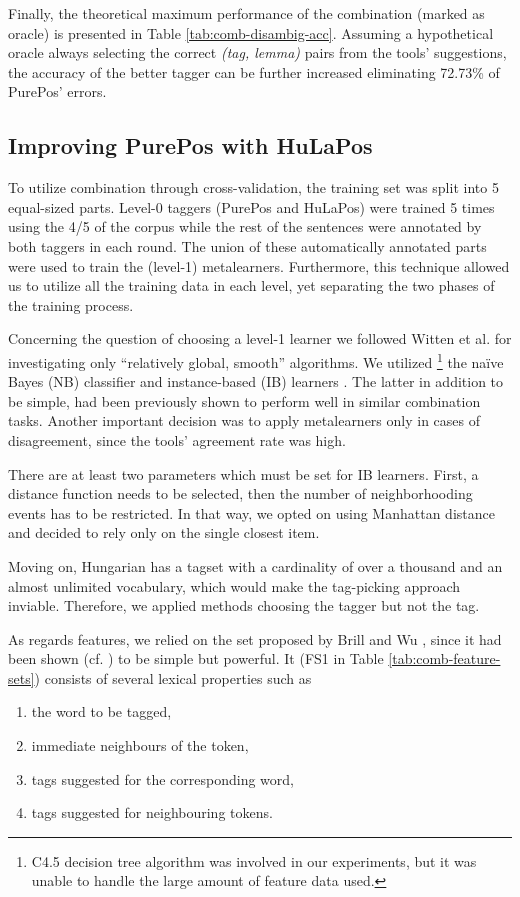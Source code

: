 Finally, the theoretical maximum performance of the combination (marked as oracle) is presented in Table \ref{tab:comb-disambig-acc}.
Assuming a hypothetical oracle always selecting the correct \emph{(tag, lemma)} pairs from the tools' suggestions, the accuracy of the better tagger can be further increased eliminating 72.73\% of PurePos' errors. 

\subsection{Improving PurePos with HuLaPos}

To utilize combination through cross-validation, the training set was split into 5 equal-sized parts.
Level-0 taggers (PurePos and HuLaPos) were trained 5 times using the 4/5 of the corpus while the rest of the sentences were annotated by both taggers in each round.
The union of these automatically annotated parts were used to train the (level-1) metalearners.
Furthermore, this technique allowed us to utilize all the training data in each level, yet separating the two phases of the training process. 

Concerning the question of choosing a level-1 learner we followed Witten et al. \cite{Witten2011} for investigating only ``relatively global, smooth'' algorithms.
We utilized \footnote{C4.5 decision tree algorithm was involved in our experiments, but it was unable to handle the large amount of feature data used.} the naïve Bayes (NB) classifier \cite{John1995} and instance-based (IB) learners \cite{Aha1991}.
The latter in addition to be simple, had been previously shown to perform well in similar combination tasks.
Another important decision was to apply metalearners only in cases of disagreement, since the tools’ agreement rate was high.

There are at least two parameters which must be set for IB learners.
First, a distance function needs to be selected, then the number of neighborhooding events has to be restricted.
In that way, we opted on using Manhattan distance and decided to rely only on the single closest item. 

Moving on, Hungarian has a tagset with a cardinality of over a thousand and an almost unlimited vocabulary, which would make the tag-picking approach inviable. Therefore, we applied methods choosing the tagger but not the tag. 

As regards features, we relied on the set proposed by Brill and Wu \cite{Brill1998}, since it had been shown (cf. \cite{Halteren2001}) to be simple but powerful. It (FS1 in Table \ref{tab:comb-feature-sets}) consists of several lexical properties such as
\begin{enumerate}
 \item the word to be tagged, 
 \item immediate neighbours of the token,
 \item tags suggested for the corresponding word,
 \item tags suggested for neighbouring tokens.
\end{enumerate}

